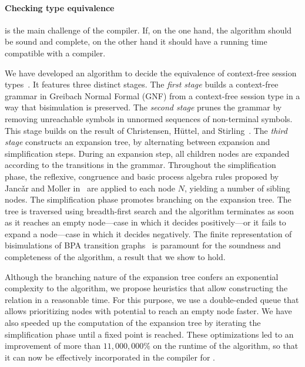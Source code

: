 
\paragraph{Checking type equivalence}

is the main challenge of the compiler. If, on the one hand, the
algorithm should be sound and complete, on the other hand it should
have a running time compatible with a compiler.  %

We have developed an algorithm to decide the equivalence of
context-free session types~\cite{typeEquivalence}.  It features three
distinct stages.
%
The \emph{first stage} builds a context-free grammar in Greibach
Normal Formal (GNF) %
from a context-free session type in a way that bisimulation is
preserved.
%
The \emph{second stage} prunes the grammar by removing unreachable
symbols in unnormed sequences of non-terminal symbols. This stage
builds on the result of Christensen, H\"uttel, and 
Stirling~\cite{DBLP:journals/iandc/ChristensenHS95}.
%
The \emph{third stage} constructs an expansion tree, by alternating
between expansion and simplification steps. During an expansion step, 
all children nodes are expanded according to the transitions in the 
grammar. %
Throughout the simplification phase, the reflexive, congruence and basic
process algebra rules proposed by Janc\v ar and Moller
in~\cite{janvcar1999techniques} are applied to each node $N$, yielding
a number of sibling nodes.  The simplification phase promotes
branching on the expansion tree.  The tree is traversed using
breadth-first search and the algorithm terminates as soon as it
reaches an empty node---case in which it decides positively---or it
fails to expand a node---case in which it decides negatively.  The
finite representation of bisimulations of BPA transition
graphs~\cite{caucal1986decidabilite,
  DBLP:journals/iandc/ChristensenHS95} is paramount for the soundness
and completeness of the algorithm, a result that we show to hold.

Although the branching nature of the expansion tree confers an
exponential complexity to the algorithm, we propose heuristics that
allow constructing the relation in a reasonable time. For this
purpose, we use a double-ended queue that allows prioritizing nodes
with potential to reach an empty node faster.  We have also speeded up
the computation of the expansion tree by iterating the simplification
phase until a fixed point is reached.  These optimizations led to an
improvement of more than $11,000,000\%$ on the runtime of the
algorithm, so that it can now be effectively incorporated in the
compiler for \freest.

